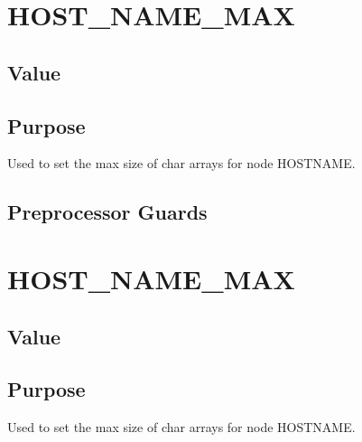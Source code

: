 \documentclass[letterpaper,10pt,english]{sphinxmanual}
\begin{document}
\section{HOST\_NAME\_MAX}
\label{\detokenize{definitions/definitions:host-name-max}}\label{\detokenize{definitions/definitions:id12}}

\subsection{Value}
\label{\detokenize{definitions/definitions:id13}}
\sphinxAtStartPar
{}


\subsection{Purpose}
\label{\detokenize{definitions/definitions:id14}}
\sphinxAtStartPar
Used to set the max size of char arrays for node HOSTNAME.


\subsection{Preprocessor Guards}
\label{\detokenize{definitions/definitions:id15}}
\sphinxAtStartPar
{}


\section{HOST\_NAME\_MAX}
\label{\detokenize{definitions/definitions:id16}}\label{\detokenize{definitions/definitions:id17}}

\subsection{Value}
\label{\detokenize{definitions/definitions:id18}}
\sphinxAtStartPar
{}


\subsection{Purpose}
\label{\detokenize{definitions/definitions:id19}}
\sphinxAtStartPar
Used to set the max size of char arrays for node HOSTNAME.
\end{document}
